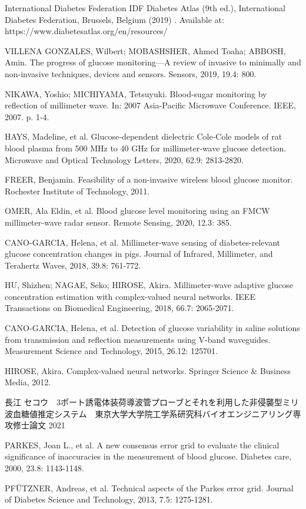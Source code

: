\documentclass[11pt,a4paper,uplatex,draft]{ujarticle}
\begin{document}
\newpage
\begin{thebibliography}{99}
 International Diabetes Federation IDF Diabetes Atlas (9th ed.), International Diabetes Federation, Brussels, Belgium (2019) . Available at: https://www.diabetesatlas.org/en/resources/

 VILLENA GONZALES, Wilbert; MOBASHSHER, Ahmed Toaha; ABBOSH, Amin. The progress of glucose monitoring—A review of invasive to minimally and non-invasive techniques, devices and sensors. Sensors, 2019, 19.4: 800.

 NIKAWA, Yoshio; MICHIYAMA, Tetsuyuki. Blood-sugar monitoring by reflection of millimeter wave. In: 2007 Asia-Pacific Microwave Conference. IEEE, 2007. p. 1-4.

  HAYS, Madeline, et al. Glucose‐dependent dielectric Cole‐Cole models of rat blood plasma from 500 MHz to 40 GHz for millimeter‐wave glucose detection. Microwave and Optical Technology Letters, 2020, 62.9: 2813-2820.

 FREER, Benjamin. Feasibility of a non-invasive wireless blood glucose monitor. Rochester Institute of Technology, 2011.


 OMER, Ala Eldin, et al. Blood glucose level monitoring using an FMCW millimeter-wave radar sensor. Remote Sensing, 2020, 12.3: 385.

 CANO-GARCIA, Helena, et al. Millimeter-wave sensing of diabetes-relevant glucose concentration changes in pigs. Journal of Infrared, Millimeter, and Terahertz Waves, 2018, 39.8: 761-772.

 HU, Shizhen; NAGAE, Seko; HIROSE, Akira. Millimeter-wave adaptive glucose concentration estimation with complex-valued neural networks. IEEE Transactions on Biomedical Engineering, 2018, 66.7: 2065-2071.

 CANO-GARCIA, Helena, et al. Detection of glucose variability in saline solutions from transmission and reflection measurements using V-band waveguides. Measurement Science and Technology, 2015, 26.12: 125701.

 HIROSE, Akira. Complex-valued neural networks. Springer Science \& Business Media, 2012.

 長江 セコウ　3ポート誘電体装荷導波管プローブとそれを利用した非侵襲型ミリ波血糖値推定システム　東京大学大学院工学系研究科バイオエンジニアリング専攻修士論文 2021

 PARKES, Joan L., et al. A new consensus error grid to evaluate the clinical significance of inaccuracies in the measurement of blood glucose. Diabetes care, 2000, 23.8: 1143-1148.

 PFÜTZNER, Andreas, et al. Technical aspects of the Parkes error grid. Journal of Diabetes Science and Technology, 2013, 7.5: 1275-1281.

\end{thebibliography}
\end{document}
